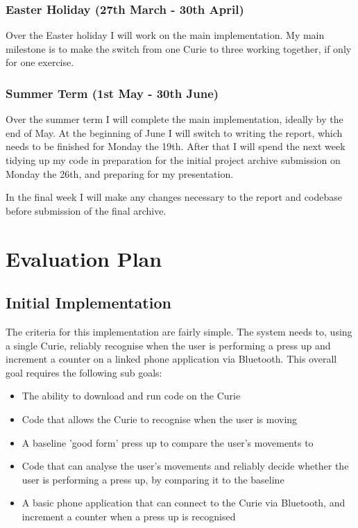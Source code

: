\documentclass[a4paper]{article}
\begin{document}
\subsubsection{Easter Holiday (27th March - 30th April)}

Over the Easter holiday I will work on the main implementation. My main milestone is to make the switch from one Curie to three working together, if only for one exercise. 

\subsubsection{Summer Term (1st May - 30th June)}

Over the summer term I will complete the main implementation, ideally by the end of May. At the beginning of June I will switch to writing the report, which needs to be finished for Monday the 19th. After that I will spend the next week tidying up my code in preparation for the initial project archive submission on Monday the 26th, and preparing for my presentation. 

In the final week I will make any changes necessary to the report and codebase before submission of the final archive. 

\newpage
\section{Evaluation Plan}

\subsection{Initial Implementation}%

The criteria for this implementation are fairly simple. The system needs to, using a single Curie, reliably recognise when the user is performing a press up and increment a counter on a linked phone application via Bluetooth. This overall goal requires the following sub goals:

\begin{itemize}
    \item The ability to download and run code on the Curie
    \item Code that allows the Curie to recognise when the user is moving 
    \item A baseline 'good form' press up to compare the user's movements to
    \item Code that can analyse the user's movements and reliably decide whether the user is performing a press up, by comparing it to the baseline
    \item A basic phone application that can connect to the Curie via Bluetooth, and increment a counter when a press up is recognised
\end{itemize}
\end{document}
